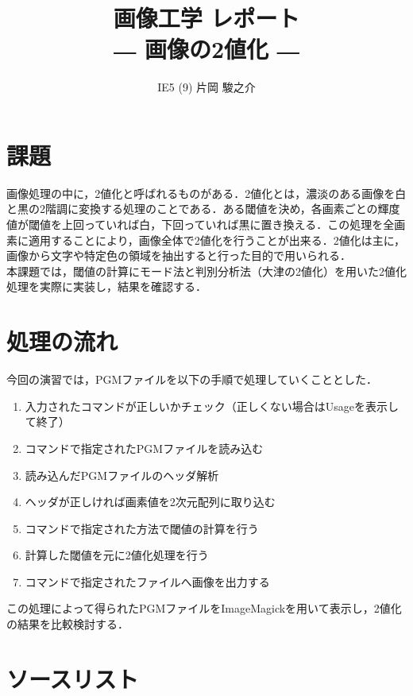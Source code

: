 \documentclass{jsarticle}
\begin{document}
\title{画像工学 レポート\\ \vspace{1cm}― 画像の2値化 ―\vspace{2cm}}
\author{IE5 (9) 片岡 駿之介 \vspace{1cm}}
\maketitle

\newpage

\section{課題}

画像処理の中に，2値化と呼ばれるものがある．2値化とは，濃淡のある画像を白と黒の2階調に変換する処理のことである．ある閾値を決め，各画素ごとの輝度値が閾値を上回っていれば白，下回っていれば黒に置き換える．この処理を全画素に適用することにより，画像全体で2値化を行うことが出来る．2値化は主に，画像から文字や特定色の領域を抽出すると行った目的で用いられる．\\
本課題では，閾値の計算にモード法と判別分析法（大津の2値化）を用いた2値化処理を実際に実装し，結果を確認する．

\section{処理の流れ}

今回の演習では，PGMファイルを以下の手順で処理していくこととした．
\begin{enumerate}
  \item 入力されたコマンドが正しいかチェック（正しくない場合はUsageを表示して終了）
  \item コマンドで指定されたPGMファイルを読み込む
  \item 読み込んだPGMファイルのヘッダ解析
  \item ヘッダが正しければ画素値を2次元配列に取り込む
  \item コマンドで指定された方法で閾値の計算を行う
  \item 計算した閾値を元に2値化処理を行う
  \item コマンドで指定されたファイルへ画像を出力する
\end{enumerate}

この処理によって得られたPGMファイルをImageMagickを用いて表示し，2値化の結果を比較検討する．\\
\newpage

\section{ソースリスト}
\end{document}
